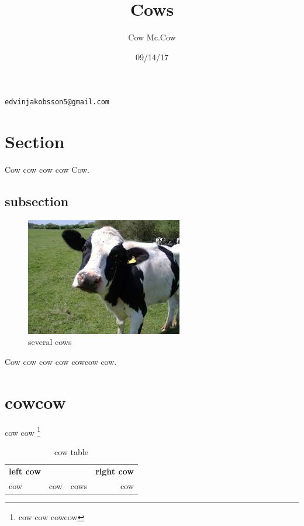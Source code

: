 \documentclass[a4paper,10pt]{article}
\author{Cow Mc.Cow}
\title{Cows}
\date{09/14/17}
\begin{document}
 
 
\maketitle
  
 \begin{center}
  \texttt{edvinjakobsson5@gmail.com}
 \end{center}


 
\section{Section}

Cow cow cow cow Cow.

\subsection{subsection}
 
 \begin{figure}[h]
\begin{center}
 \includegraphics{cow.jpeg}
 \caption{several cows}
\label{cowpicture}
 \end{center}
\end{figure}

Cow cow cow cow cowcow cow.

\section{cowcow}

cow cow \footnote{cow cow cowcow}

\begin{table}[ht]
 \begin{center}
  \caption{cow table}
  \label{tablecow}
  \begin{tabular}{l|c|c|r}
\textbf{left cow}&&&\textbf{right cow}\\
cow &cow&cows&cow \\
 \end{tabular}

 \end{center}

\end{table}
\end{document}
